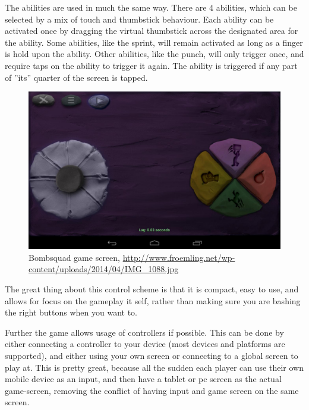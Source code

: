 The abilities are used in much the same way. 
There are 4 abilities, which can be selected by a mix of touch and thumbstick behaviour. 
Each ability can be activated once by dragging the virtual thumbstick across the designated area for the ability. 
Some abilities, like the sprint, will remain activated as long as a finger is hold upon the ability. 
Other abilities, like the punch, will only trigger once, and require taps on the ability to trigger it again. 
The ability is triggered if any part of ''its'' quarter of the screen is tapped.

\begin{figure}[h]
\centering
\includegraphics[width=1\textwidth]{figures/analysis/controlscheme/onscreen_control}
\caption{Bombsquad game screen, \url{http://www.froemling.net/wp-content/uploads/2014/04/IMG_1088.jpg}}
\end{figure}

The great thing about this control scheme is that it is compact, easy to use, and allows for focus on the gameplay it self, rather than making sure you are bashing the right buttons when you want to.

Further the game allows usage of controllers if possible. 
This can be done by either connecting a controller to your device (most devices and platforms are supported), and either using your own screen or connecting to a global screen to play at.
This is pretty great, because all the sudden each player can use their own mobile device as an input, and then have a tablet or pc screen as the actual game-screen, removing the conflict of having input and game screen on the same screen.

